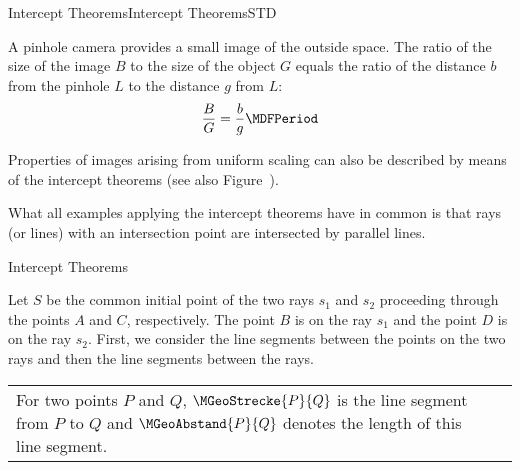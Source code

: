 \begin{MXContent}{Intercept Theorems}{Intercept Theorems}{STD}

A pinhole camera provides a small image of the outside space. The ratio 
of the size of the image $B$ to the size of the object $G$ equals 
the ratio of the distance $b$ from the pinhole $L$ to the distance $g$
from $L$:
\[
\frac{B}{G} = \frac{b}{g} \MDFPeriod %
\]

\begin{center}
\end{center}

Properties of images arising from uniform scaling can also 
be described by means of the intercept theorems (see also 
Figure~).

What all examples applying the intercept theorems have in common is that rays (or lines)
with an intersection point are intersected by parallel lines.

\begin{MXInfo}{Intercept Theorems}%
%

Let $S$ be the common initial point of the two rays $s_1$ and $s_2$ proceeding through the points $A$ 
and $C$, respectively. The point $B$ is on the ray $s_1$ and the point $D$ is on the ray $s_2$.
First, we consider the line segments between the points on the two rays and then the line segments between 
the rays. 

\par
\begin{tabular}{@{}lr@{}}
\begin{minipage}[b]{7cm}
For two points $P$ and $Q$, $\MGeoStrecke{P}{Q}$ is the line segment 
from $P$ to $Q$ and $\MGeoAbstand{P}{Q}$ denotes the length of this line segment. 


\end{minipage}
\end{tabular}
\end{MXInfo}
\end{MXContent}
